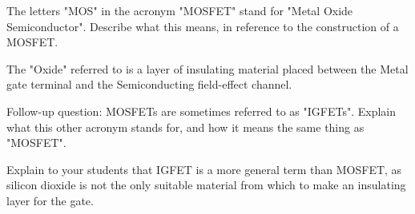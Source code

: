 

The letters "MOS" in the acronym "MOSFET" stand for "Metal Oxide Semiconductor".  Describe what this means, in reference to the construction of a MOSFET.







The "Oxide" referred to is a layer of insulating material placed between the Metal gate terminal and the Semiconducting field-effect channel.

\vskip 10pt

Follow-up question: MOSFETs are sometimes referred to as "IGFETs".  Explain what this other acronym stands for, and how it means the same thing as "MOSFET".







Explain to your students that IGFET is a more general term than MOSFET, as silicon dioxide is not the only suitable material from which to make an insulating layer for the gate.




